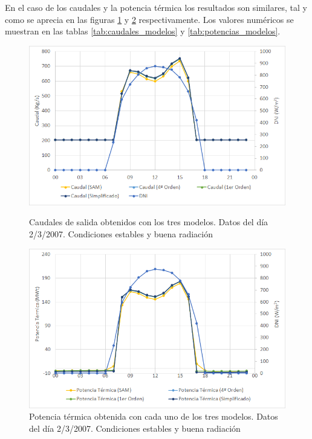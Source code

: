 En el caso de los caudales y la potencia térmica  los resultados son similares, tal y como se aprecia en las figuras \ref{fig:caudales_modelos} y \ref{fig:potencias_modelos} respectivamente. Los valores numéricos se muestran en las tablas \ref{tab:caudales_modelos} y  \ref{tab:potencias_modelos}.

\begin{figure}[H]
\caption[Caudales de salida obtenidos con los tres modelos en un día de condiciones estables]{Caudales de salida obtenidos con los tres modelos. Datos del día 2/3/2007. Condiciones estables y buena radiación} 
\includegraphics[width=0.9\linewidth]{images/caudales_modelos.png}
\label{fig:caudales_modelos}
\end{figure}

\begin{figure}[H]
\includegraphics[width=0.9\linewidth]{images/potencias_modelos.png}
\caption[Potencia térmica obtenida con cada uno de los tres modelos en un día de condiciones estables]{Potencia térmica obtenida con cada uno de los tres modelos. Datos del día 2/3/2007. Condiciones estables y buena radiación} 
\label{fig:potencias_modelos}
\end{figure}

